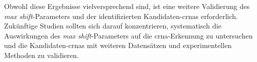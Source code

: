 Obwohl diese Ergebnisse vielversprechend sind, ist eine weitere Validierung des
\textit{max shift}-Parameters und der identifizierten Kandidaten-\glspl{crna}
erforderlich.
Zukünftige Studien sollten sich darauf konzentrieren, systematisch die
Auswirkungen des \textit{max shift}-Parameters auf die \gls{crna}-Erkennung zu
untersuchen und die Kandidaten-\glspl{crna} mit weiteren Datensätzen und
experimentellen Methoden zu validieren.
